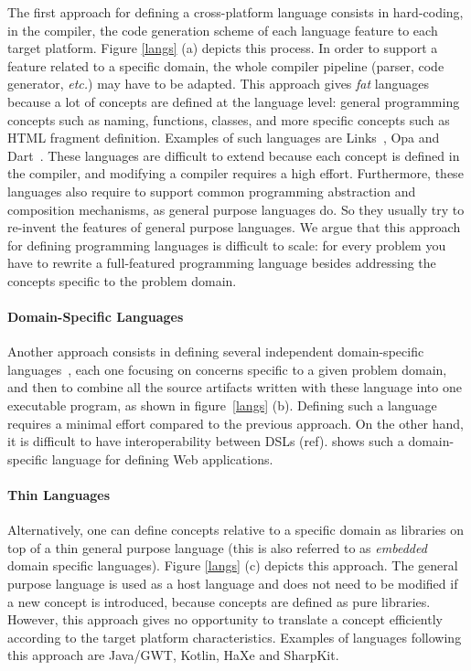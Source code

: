 \documentclass[preprint]{sigplanconf}
\newcommand{\etc}{\emph{etc.}}
\begin{document}
The first approach for defining a cross-platform language consists in hard-coding, in the compiler, the
code generation scheme of each language feature to each target platform. Figure \ref{langs} (a) depicts this
process. In order to support a feature related to a specific domain, the whole compiler pipeline (parser, code
generator, \etc) may have to be adapted. This approach gives \emph{fat} languages because a lot of concepts are
defined at the language level: general programming concepts such as naming, functions, classes, and more specific
concepts such as HTML fragment definition. Examples of such languages are Links~\cite{Cooper07_Links}, Opa and
Dart~\cite{Griffith11_Dart}. These languages are difficult to extend because each concept is defined in the compiler,
and modifying a compiler requires a high effort. Furthermore, these languages also require to support common
programming abstraction and composition mechanisms, as general purpose languages do. So they usually try to re-invent
the features of general purpose languages. We argue that this approach for defining programming languages is
difficult to scale: for every problem you have to rewrite a full-featured programming language besides addressing the
concepts specific to the problem domain.

\paragraph{Domain-Specific Languages}

Another approach consists in defining several independent domain-specific languages~\cite{Van00_DSL}, each one
focusing on concerns specific to a given problem domain, and then to combine all the source artifacts written with
these language into one executable program, as shown in figure~\ref{langs} (b). Defining such a language requires a
minimal effort compared to the previous approach. On the other hand, it is difficult to have interoperability between
DSLs (ref). \cite{Groenewegen08_WebDSL} shows such a domain-specific language for defining Web applications.

\paragraph{Thin Languages}

Alternatively, one can define concepts relative to a specific domain as libraries on top of a thin general purpose
language (this is also referred to as \emph{embedded} domain specific languages). Figure \ref{langs} (c) depicts this
approach. The general purpose language is used as a host language and does not need to be modified if a new concept
is introduced, because concepts are defined as pure libraries. However, this approach gives no opportunity to
translate a concept efficiently according to the target platform characteristics. Examples of languages following
this approach are Java/GWT, Kotlin, HaXe and SharpKit.
\end{document}
